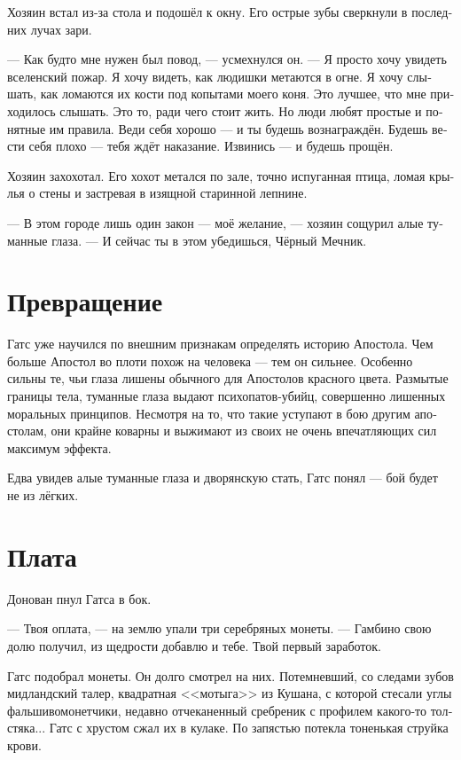 \documentclass[a4paper,12pt,fleqn]{book}\usepackage{polyglossia}\setdefaultlanguage[babelshorthands=true]{russian}\setotherlanguage{english}\defaultfontfeatures{Ligatures=TeX,Mapping=tex-text}\usepackage{xcolor}\newcommand{\ml}[3]{#2}
\begin{document}
Хозяин встал из-за стола и подошёл к окну.
Его острые зубы сверкнули в последних лучах зари.

--- Как будто мне нужен был повод, --- усмехнулся он.
--- Я просто хочу увидеть вселенский пожар.
Я хочу видеть, как людишки метаются в огне.
Я хочу слышать, как ломаются их кости под копытами моего коня.
Это лучшее, что мне приходилось слышать.
Это то, ради чего стоит жить.
Но люди любят простые и понятные им правила.
Веди себя хорошо --- и ты будешь вознаграждён.
Будешь вести себя плохо --- тебя ждёт наказание.
Извинись --- и будешь прощён.

Хозяин захохотал.
Его хохот метался по зале, точно испуганная птица, ломая крылья о стены и застревая в изящной старинной лепнине.

--- В этом городе лишь один закон --- моё желание, --- хозяин сощурил алые туманные глаза.
--- И сейчас ты в этом убедишься, Чёрный Мечник.

\section{Превращение}

Гатс уже научился по внешним признакам определять историю Апостола.
Чем больше Апостол во плоти похож на человека --- тем он сильнее.
Особенно сильны те, чьи глаза лишены обычного для Апостолов красного цвета.
Размытые границы тела, туманные глаза выдают психопатов-убийц, совершенно лишенных моральных принципов.
Несмотря на то, что такие уступают в бою другим апостолам, они крайне коварны и выжимают из своих не очень впечатляющих сил максимум эффекта.

Едва увидев алые туманные глаза и дворянскую стать, Гатс понял --- бой будет не из лёгких.

\section{Плата}

Донован пнул Гатса в бок.

--- Твоя оплата, --- на землю упали три серебряных монеты.
--- Гамбино свою долю получил, из щедрости добавлю и тебе.
Твой первый заработок.

Гатс подобрал монеты.
Он долго смотрел на них.
Потемневший, со следами зубов мидландский талер, квадратная <<мотыга>> из Кушана, с которой стесали углы фальшивомонетчики, недавно отчеканенный сребреник с профилем какого-то толстяка...
Гатс с хрустом сжал их в кулаке.
По запястью потекла тоненькая струйка крови.
\end{document}
